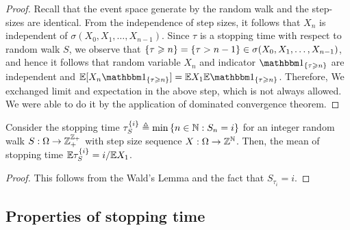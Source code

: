 \documentclass[a4paper,10pt,english]{article}
\begin{document}
\begin{proof} 
Recall that the event space generate by the random walk and the step-sizes are identical. 
From the independence of step sizes, it follows that $X_n$ is independent of $\sigma(X_0, X_1, \dots, X_{n-1})$. 
Since $\tau$ is a stopping time with respect to random walk $S$, 
we observe that $\left\{\tau \geqslant n\right\} = \left\{\tau > n-1\right\} \in \sigma(X_0, X_1, \dots, X_{n-1})$,  
and hence it follows that random variable $X_n$ and indicator $\SetIn{\tau \ge n}$ are independent and $\E[X_n\SetIn{\tau \ge n}] = \E X_1 \E\SetIn{\tau \ge n}$. 
Therefore,
We exchanged limit and expectation in the above step, which is not always allowed. 
We were able to do it %
by the application of dominated convergence theorem. 
\end{proof}
\begin{cor} 
Consider the stopping time $\tau_S^{\left\{i\right\}} \triangleq \min\left\{n \in \mathbb{N}: S_n = i\right\}$ for an integer random walk $S: \Omega \to \mathbb{Z}_+^{\mathbb{Z}_+}$ with \iid step size sequence $X: \Omega \to \mathbb{Z}^{\mathbb{N}}$.  
Then, the mean of stopping time $\mathbb{E} \tau_S^{\left\{i\right\}} = {i}/{\mathbb{E} X_1}$. 
\end{cor}
\begin{proof} 
This follows from the Wald's Lemma and the fact that $S_{\tau_i} = i$. 
\end{proof}


\subsection{Properties of stopping time} 
\end{document}

